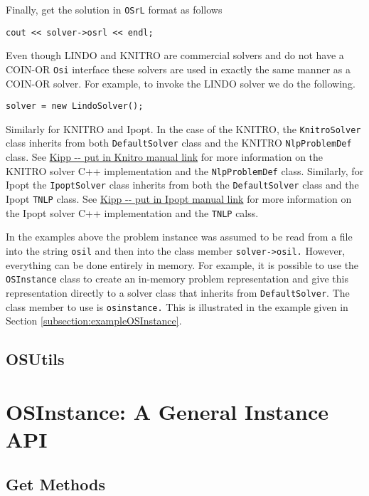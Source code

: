 \documentclass[12pt]{article}
\renewcommand{\_}{{\char"5F}}
\renewcommand{\{}{{\char"7B}}
\renewcommand{\}}{{\char"7D}}
\renewcommand{\^}{{\char"0D}}
\renewcommand{\'}{{\char"0D}}
\begin{document}
Finally, get the solution in {\tt OSrL} format as follows

\begin{verbatim}
cout << solver->osrl << endl;
\end{verbatim}

Even though LINDO and KNITRO are commercial solvers and do not have a COIN-OR {\tt Osi} interface these solvers are used in exactly the same manner as a COIN-OR solver. For example, to invoke the LINDO solver we do the following.

\begin{verbatim}
solver = new LindoSolver();	
\end{verbatim}

Similarly for KNITRO and Ipopt. In the case of the KNITRO, the {\tt KnitroSolver} class inherits from both {\tt DefaultSolver} class and the KNITRO {\tt NlpProblemDef} class. See \url{Kipp -- put in Knitro manual link} for more information on the KNITRO solver C++ implementation and the {\tt NlpProblemDef} class. Similarly, for Ipopt the {\tt IpoptSolver} class inherits from both the  {\tt DefaultSolver} class and the Ipopt {\tt TNLP} class.  See \url{Kipp -- put in Ipopt manual link} for more information on the Ipopt solver C++ implementation and the {\tt TNLP} calss.

In the examples above the problem instance was assumed to be read from a file into the string {\tt osil} and then into the class member {\tt solver->osil.} However, everything can be done entirely in memory. For example, it is possible to use the {\tt OSInstance} class to create an in-memory problem representation and give this representation directly to a solver class that inherits from {\tt DefaultSolver}. The class member to use is {\tt osinstance.} This is illustrated in the example given in Section \ref{subsection:exampleOSInstance}.


\subsection{OSUtils}

\section{OSInstance: A General Instance API}

\subsection{Get Methods}
\end{document}
